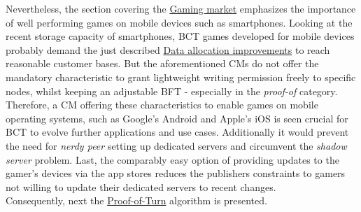 \noindent Nevertheless, the section covering the \hyperref[sec:GamingMarket]{Gaming market}
emphasizes the importance of well performing games on mobile devices such as smartphones.
Looking at the recent storage capacity of smartphones, \gls{BCT} games
developed for mobile devices probably demand the just described
\hyperref[sec:DataAllocationImprovements]{Data allocation improvements} to reach reasonable customer bases.
But the aforementioned \gls{CM}s do not offer the mandatory characteristic
to grant lightweight writing permission freely to specific nodes, whilst
keeping an adjustable \gls{BFT} - especially in the \textit{proof-of} category. \\
Therefore, a \gls{CM} offering these characteristics to enable games
on mobile operating systems, such as Google's Android and Apple's iOS is seen crucial
for \gls{BCT} to evolve further applications and use cases.
Additionally it would prevent the need for \textit{nerdy peer} setting up dedicated servers
and circumvent the \textit{shadow server} problem.
Last, the comparably easy option of providing updates to the gamer's devices via the app stores
reduces the publishers constraints to gamers not willing to update their dedicated servers to recent changes. \\
Consequently, next the \hyperref[chap:PoT]{Proof-of-Turn} algorithm is presented.


